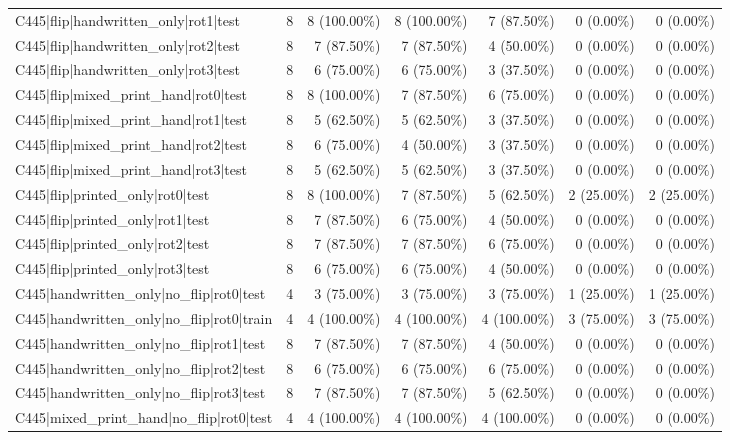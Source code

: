 \begin{longtable}{>{\raggedright\arraybackslash}p{5cm}rrrrrr}
C445|flip|handwritten\_only|rot1|test & 8 & 8 (100.00\%) & 8 (100.00\%) & 7 (87.50\%) & 0 (0.00\%) & 0 (0.00\%) \\
C445|flip|handwritten\_only|rot2|test & 8 & 7 (87.50\%) & 7 (87.50\%) & 4 (50.00\%) & 0 (0.00\%) & 0 (0.00\%) \\
C445|flip|handwritten\_only|rot3|test & 8 & 6 (75.00\%) & 6 (75.00\%) & 3 (37.50\%) & 0 (0.00\%) & 0 (0.00\%) \\
C445|flip|mixed\_print\_hand|rot0|test & 8 & 8 (100.00\%) & 7 (87.50\%) & 6 (75.00\%) & 0 (0.00\%) & 0 (0.00\%) \\
C445|flip|mixed\_print\_hand|rot1|test & 8 & 5 (62.50\%) & 5 (62.50\%) & 3 (37.50\%) & 0 (0.00\%) & 0 (0.00\%) \\
C445|flip|mixed\_print\_hand|rot2|test & 8 & 6 (75.00\%) & 4 (50.00\%) & 3 (37.50\%) & 0 (0.00\%) & 0 (0.00\%) \\
C445|flip|mixed\_print\_hand|rot3|test & 8 & 5 (62.50\%) & 5 (62.50\%) & 3 (37.50\%) & 0 (0.00\%) & 0 (0.00\%) \\
C445|flip|printed\_only|rot0|test & 8 & 8 (100.00\%) & 7 (87.50\%) & 5 (62.50\%) & 2 (25.00\%) & 2 (25.00\%) \\
C445|flip|printed\_only|rot1|test & 8 & 7 (87.50\%) & 6 (75.00\%) & 4 (50.00\%) & 0 (0.00\%) & 0 (0.00\%) \\
C445|flip|printed\_only|rot2|test & 8 & 7 (87.50\%) & 7 (87.50\%) & 6 (75.00\%) & 0 (0.00\%) & 0 (0.00\%) \\
C445|flip|printed\_only|rot3|test & 8 & 6 (75.00\%) & 6 (75.00\%) & 4 (50.00\%) & 0 (0.00\%) & 0 (0.00\%) \\
C445|handwritten\_only|no\_flip|rot0|test & 4 & 3 (75.00\%) & 3 (75.00\%) & 3 (75.00\%) & 1 (25.00\%) & 1 (25.00\%) \\
C445|handwritten\_only|no\_flip|rot0|train & 4 & 4 (100.00\%) & 4 (100.00\%) & 4 (100.00\%) & 3 (75.00\%) & 3 (75.00\%) \\
C445|handwritten\_only|no\_flip|rot1|test & 8 & 7 (87.50\%) & 7 (87.50\%) & 4 (50.00\%) & 0 (0.00\%) & 0 (0.00\%) \\
C445|handwritten\_only|no\_flip|rot2|test & 8 & 6 (75.00\%) & 6 (75.00\%) & 6 (75.00\%) & 0 (0.00\%) & 0 (0.00\%) \\
C445|handwritten\_only|no\_flip|rot3|test & 8 & 7 (87.50\%) & 7 (87.50\%) & 5 (62.50\%) & 0 (0.00\%) & 0 (0.00\%) \\
C445|mixed\_print\_hand|no\_flip|rot0|test & 4 & 4 (100.00\%) & 4 (100.00\%) & 4 (100.00\%) & 0 (0.00\%) & 0 (0.00\%) \\

\end{longtable}
